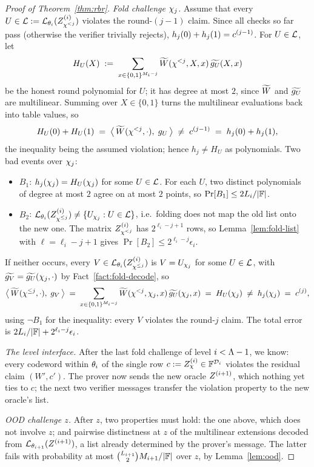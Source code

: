 \begin{proof}[Proof of Theorem~\ref{thm:rbr}]
\medskip\noindent\emph{Fold challenge $\chi_j$.}
Assume that every $U \in \mathcal{L} := \mathcal{L}_{\theta_i}(Z^{(i)}_{\chi^{<j}})$ violates the round-$(j{-}1)$ claim. Since all checks so far pass (otherwise the verifier trivially rejects), $h_j(0) + h_j(1) = c^{(j-1)}$. For $U \in \mathcal{L}$, let
\[
H_U(X) \;:=\; \sum_{x \in \{0,1\}^{M_i - j}} \widetilde{W}(\chi^{<j}, X, x)\, \widetilde{g_U}(X, x)
\]
be the honest round polynomial for $U$; it has degree at most $2$, since $\widetilde{W}$ and $\widetilde{g_U}$ are multilinear. Summing over $X \in \{0, 1\}$ turns the multilinear evaluations back into table values, so
\[
H_U(0) + H_U(1) \;=\; \bigl\langle\, \widetilde{W}(\chi^{<j}, \cdot),\; g_U \,\bigr\rangle \;\neq\; c^{(j-1)} \;=\; h_j(0) + h_j(1),
\]
the inequality being the assumed violation; hence $h_j \neq H_U$ as polynomials. Two bad events over $\chi_j$:
\begin{itemize}[itemsep=1pt]
\item $B_1$: $h_j(\chi_j) = H_U(\chi_j)$ for some $U \in \mathcal{L}$. For each $U$, two distinct polynomials of degree at most $2$ agree on at most $2$ points, so $\Pr[B_1] \le 2 L_i / |\mathbb{F}|$.
\item $B_2$: $\mathcal{L}_{\theta_i}(Z^{(i)}_{\chi^{\le j}}) \neq \{ U_{\chi_j} : U \in \mathcal{L} \}$, i.e.\ folding does not map the old list onto the new one. The matrix $Z^{(i)}_{\chi^{<j}}$ has $2^{\ell_i - j + 1}$ rows, so Lemma~\ref{lem:fold-list} with $\ell = \ell_i - j + 1$ gives $\Pr[B_2] \le 2^{\ell_i - j} \epsilon_i$.
\end{itemize}
If neither occurs, every $V \in \mathcal{L}_{\theta_i}(Z^{(i)}_{\chi^{\le j}})$ is $V = U_{\chi_j}$ for some $U \in \mathcal{L}$, with $\widetilde{g_V} = \widetilde{g_U}(\chi_j, \cdot)$ by Fact~\ref{fact:fold-decode}, so
\[
\bigl\langle\, \widetilde{W}(\chi^{\le j}, \cdot),\; g_V \,\bigr\rangle
\;=\; \sum_{x \in \{0,1\}^{M_i - j}} \widetilde{W}(\chi^{<j}, \chi_j, x)\, \widetilde{g_U}(\chi_j, x)
\;=\; H_U(\chi_j) \;\neq\; h_j(\chi_j) \;=\; c^{(j)} ,
\]
using $\neg B_1$ for the inequality: every $V$ violates the round-$j$ claim. The total error is $2 L_i/|\mathbb{F}| + 2^{\ell_i - j} \epsilon_i$.

\medskip\noindent\emph{The level interface.}
After the last fold challenge of level $i < \Lambda - 1$, we know: every codeword within $\theta_i$ of the single row $c := Z^{(i)}_\chi \in \mathbb{F}^{\mathcal{D}_i}$ violates the residual claim $(W', c')$. The prover now sends the new oracle $Z^{(i+1)}$, which nothing yet ties to $c$; the next two verifier messages transfer the violation property to the new oracle's list.

\medskip\noindent\emph{OOD challenge $z$.}
After $z$, two properties must hold: the one above, which does not involve $z$; and pairwise distinctness at $z$ of the multilinear extensions decoded from $\mathcal{L}_{\theta_{i+1}}(Z^{(i+1)})$, a list already determined by the prover's message. The latter fails with probability at most $\binom{L_{i+1}}{2} M_{i+1} / |\mathbb{F}|$ over $z$, by Lemma~\ref{lem:ood}.


\end{proof}
